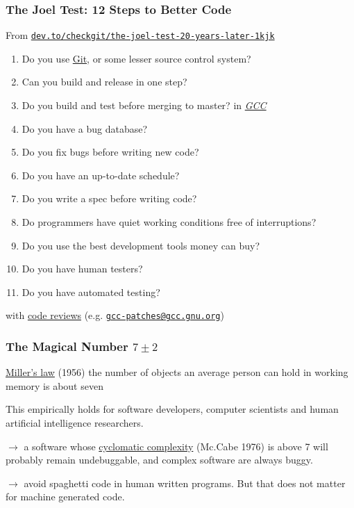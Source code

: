 \documentclass[xcolor=svgnames,final,smaller,a4]{beamer}
\begin{document}
 \begin{frame}
   \frametitle{The Joel Test: 12 Steps to Better Code}
   From \href{https://dev.to/checkgit/the-joel-test-20-years-later-1kjk}{\texttt{dev.to/checkgit/the-joel-test-20-years-later-1kjk}}
   \begin{relsize}{-1.0}
     \begin{enumerate}
       \item Do you use \href{http://git-scm.com/}{Git}, or some lesser source control system?
       \item Can you build and release in one step?
       \item Do you build and test before merging to master? \textcolor{red}{\texttt{}} in \href{https://gcc.gnu.org/}{\textit{GCC}}
    \item Do you have a bug database?
    \item Do you fix bugs before writing new code?
    \item Do you have an up-to-date schedule?
    \item Do you write a spec before writing code?
    \item Do programmers have quiet working conditions free of interruptions?
    \item Do you use the best development tools money can buy?
    \item Do you have human testers?
    \item Do you have automated testing?
     \end{enumerate}
   \end{relsize}
   with \href{https://en.wikipedia.org/wiki/Code_review}{code reviews}
   (e.g. \href{https://gcc.gnu.org/ml/gcc-patches/}{\texttt{gcc-patches@gcc.gnu.org}})
 \end{frame}

 \begin{frame}
   \frametitle{The Magical Number $7 \pm 2$ }

   \begin{block}{\href{https://en.wikipedia.org/wiki/The_Magical_Number_Seven,_Plus_or_Minus_Two}{Miller's law} (1956)}
     the number of objects an average person can hold in working
     memory is about seven
   \end{block}

   \bigskip
   
   This empirically holds for software developers, computer scientists
   and human artificial intelligence researchers.

   \medskip
   
   $\rightarrow$ a software whose
   \href{https://en.wikipedia.org/wiki/Cyclomatic_complexity}{cyclomatic
     complexity} (Mc.Cabe 1976) is above 7 will probably remain
   undebuggable, and complex software are always buggy.

   \medskip
   
   $\rightarrow$ avoid spaghetti code in human written programs. But that does not matter for machine generated code.

 \end{frame}
\end{document}
